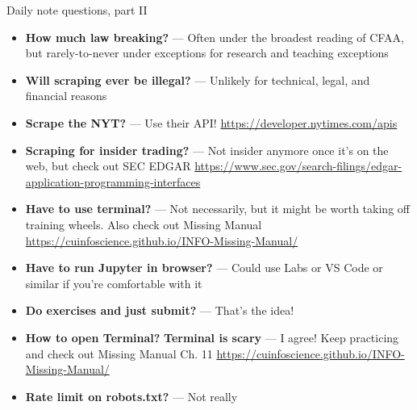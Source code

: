 \documentclass[9pt,aspectratio=169]{beamer}
\begin{document}
\begin{frame}{Daily note questions, part II}\small 
    \begin{itemize}
        \item \textbf{How much law breaking?} --- Often under the broadest reading of CFAA, but rarely-to-never under exceptions for research and teaching exceptions
        \item \textbf{Will scraping ever be illegal?} --- Unlikely for technical, legal, and financial reasons
        \item \textbf{Scrape the NYT?} --- Use their API! \url{https://developer.nytimes.com/apis}
        \item \textbf{Scraping for insider trading?} --- Not insider anymore once it's on the web, but check out SEC EDGAR \url{https://www.sec.gov/search-filings/edgar-application-programming-interfaces}
        \item \textbf{Have to use terminal?} --- Not necessarily, but it might be worth taking off training wheels. Also check out Missing Manual \url{https://cuinfoscience.github.io/INFO-Missing-Manual/}
        \item \textbf{Have to run Jupyter in browser?} --- Could use Labs or VS Code or similar if you're comfortable with it
        \item \textbf{Do exercises and just submit?} --- That's the idea!
        \item \textbf{How to open Terminal?} \textbf{Terminal is scary} --- I agree! Keep practicing and check out Missing Manual Ch. 11 \url{https://cuinfoscience.github.io/INFO-Missing-Manual/}
        \item \textbf{Rate limit on robots.txt?} --- Not really
    \end{itemize}
    
\end{frame}

\end{document}
